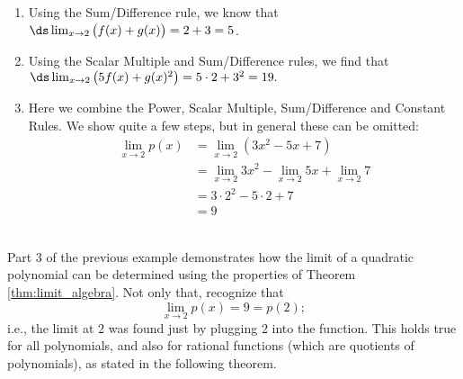 {\begin{enumerate}
\item		Using the Sum/Difference rule, we know that $\ds \lim_{x\to 2} \big(f(x) + g(x)\big) = 2+3 =5$.
\item		Using the Scalar Multiple and Sum/Difference rules, we find that $\ds \lim_{x\to 2} \big(5f(x) + g(x)^2\big) = 5\cdot 2 + 3^2 = 19.$
\item		Here we combine the Power, Scalar Multiple, Sum/Difference and Constant Rules. We show quite a few steps, but in general these can be omitted:
				\begin{align*}
				\lim_{x\to 2} p(x) &= \lim_{x\to 2} (3x^2-5x+7) \\
				&= \lim_{x\to 2} 3x^2-\lim_{x\to 2} 5x+\lim_{x\to 2}7 \\
				 &= 3\cdot 2^2 - 5\cdot 2+7 \\
				 &= 9
				\end{align*}
\end{enumerate}
\baselineskip
}\\

Part 3 of the previous example demonstrates how the limit of a quadratic polynomial can be determined using the properties of Theorem \ref{thm:limit_algebra}. Not only that, recognize that 
\[
\lim_{x\to 2} p(x) = 9 = p(2);
\]
i.e., the limit at 2 was found just by plugging 2 into the function. This holds true for all polynomials, and also for rational functions (which are quotients of polynomials), as stated in the following theorem.


